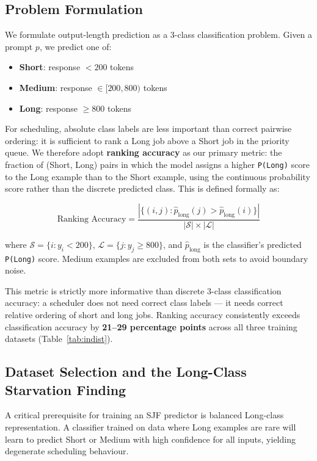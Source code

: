 \documentclass[10pt,letterpaper]{article}
\begin{document}
\subsection{Problem Formulation}

We formulate output-length prediction as a 3-class classification problem. Given a prompt $p$, we predict one of:
\begin{itemize}
  \item \textbf{Short}: response $< 200$ tokens
  \item \textbf{Medium}: response $\in [200, 800)$ tokens
  \item \textbf{Long}: response $\geq 800$ tokens
\end{itemize}

For scheduling, absolute class labels are less important than correct pairwise ordering: it is sufficient to rank a Long job above a Short job in the priority queue. We therefore adopt \textbf{ranking accuracy} as our primary metric: the fraction of (Short, Long) pairs in which the model assigns a higher \texttt{P(Long)} score to the Long example than to the Short example, using the continuous probability score rather than the discrete predicted class. This is defined formally as:

\begin{equation}
\label{eq:ranking}
\text{Ranking Accuracy} = \frac{\left|\{(i,j) : \hat{p}_{\text{long}}(j) > \hat{p}_{\text{long}}(i)\}\right|}{\left|\mathcal{S}\right| \times \left|\mathcal{L}\right|}
\end{equation}

where $\mathcal{S} = \{i : y_i < 200\}$, $\mathcal{L} = \{j : y_j \geq 800\}$, and $\hat{p}_{\text{long}}$ is the classifier's predicted \texttt{P(Long)} score. Medium examples are excluded from both sets to avoid boundary noise.

This metric is strictly more informative than discrete 3-class classification accuracy: a scheduler does not need correct class labels --- it needs correct relative ordering of short and long jobs. Ranking accuracy consistently exceeds classification accuracy by \textbf{21--29 percentage points} across all three training datasets (Table~\ref{tab:indist}).

\subsection{Dataset Selection and the Long-Class Starvation Finding}

A critical prerequisite for training an SJF predictor is balanced Long-class representation. A classifier trained on data where Long examples are rare will learn to predict Short or Medium with high confidence for all inputs, yielding degenerate scheduling behaviour.
\end{document}

